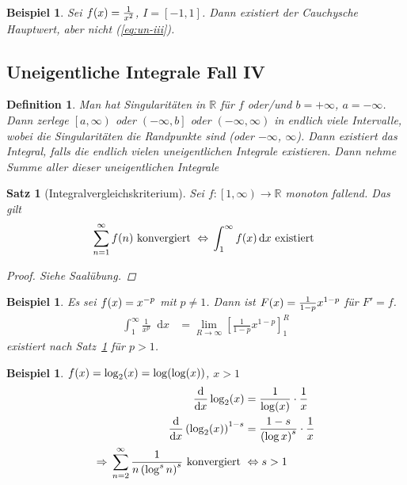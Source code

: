 \documentclass[11pt, twoside, a4paper]{article}
\theoremstyle{plain}
\newtheorem{definition}[blockelement]{Definition}
\newtheorem{satz}[blockelement]{Satz}
\newtheorem{beispiel}[blockelement]{Beispiel}
\numberwithin{equation}{subsection}
\newcommand{\pair}[1]{\left(#1\right)}
\newcommand{\of}[1]{\mathopen{}\mathclose{}\bgroup\left(#1\aftergroup\egroup\right)}
\newcommand{\linterv}[1]{\left[#1\right)}
\newcommand{\rinterv}[1]{\left(#1\right]}
\newcommand{\interv}[1]{\left[#1\right]}
\newcommand{\equivalent}[0]{\Leftrightarrow{}}
\newcommand{\impl}[0]{\Rightarrow{}}
\newcommand{\fromto}{\rightarrow{}}
\newcommand{\dif}{\mathop{}\!\mathrm{d}}
\newcommand{\toinf}{\fromto\infty}
\newcommand{\R}{\mathbb{R}}
\begin{document}
    \begin{beispiel}
        Sei $f\of{x} = \frac{1}{x^2}$, $I=\interv{-1, 1}$. Dann existiert der Cauchysche Hauptwert, aber nicht (\ref{eq:un-iii}).
    \end{beispiel}

    \subsection{Uneigentliche Integrale Fall IV}

    \begin{definition}
        Man hat Singularitäten in $\R$ für $f$ oder/und $b=+\infty$, $a=-\infty$. Dann zerlege $\linterv{a, \infty}$ oder $\rinterv{-\infty, b}$ oder $\pair{-\infty, \infty}$ in endlich viele Intervalle, wobei die Singularitäten die Randpunkte sind (oder $-\infty$, $\infty$). Dann existiert das Integral, falls die endlich vielen uneigentlichen Integrale existieren. Dann nehme Summe aller dieser uneigentlichen Integrale
    \end{definition}

    \begin{satz}[Integralvergleichskriterium] %
        \label{satz:integral-vergleich}
        Sei $f: \linterv{1, \infty} \fromto\R$ monoton fallend. Das gilt
        \begin{align*}
            \sum_{n=1}^{\infty}  f\of{n} \text{ konvergiert } \equivalent \int_{1}^{\infty} f\of{x} \dif x \text{ existiert }
        \end{align*}
        \begin{proof}
            Siehe Saalübung.
        \end{proof}
    \end{satz}

    \begin{beispiel}
        Es sei $f\of{x} = x^{-p}$ mit $p\neq 1$. Dann ist $F\of{x} = \frac{1}{1-p}x^{1-p}$ für $F'=f$.
        \begin{align*}
            \int_{1}^{\infty} \frac{1}{x^p} \dif x &= \lim_{R\toinf} \interv{\frac{1}{1-p}x^{1-p}}_1^R
        \end{align*}
        existiert nach Satz~\ref{satz:integral-vergleich} für $p>1$.
    \end{beispiel}

    \begin{beispiel}
        $f\of{x} = \log_2\of{x} = \log\of{\log\of{x}}$, $x > 1$
        \begin{align*}
            \frac{\dif}{\dif x} \log_2\of{x} &= \frac{1}{\log\of{x}}\cdot\frac{1}{x}\\
            \frac{\dif}{\dif x}\pair{\log_2\of{x}}^{1-s} &= \frac{1-s}{\pair{\log x}^s}\cdot \frac{1}{x}\\
            \impl \sum_{n=2}^{\infty} \frac{1}{n\pair{\log^s n}^s} \text{ konvergiert } &\equivalent s > 1
        \end{align*}
    \end{beispiel}
\end{document}
